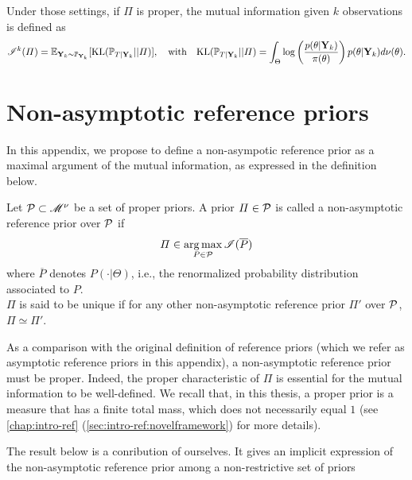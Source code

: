Under those settings, if $\varPi$ is proper, the mutual information given $k$ observations is defined   as
    \begin{equation}
        \mathscr{I}^k(\varPi) = \mathbb{E}_{\mathbf{Y}_k\sim\mathbb{P}_{\mathbf{Y}_k}}[\text{KL}(\mathbb{P}_{T|\mathbf{Y}_k}||\varPi)], \quad\text{with} \quad \text{KL}(\mathbb{P}_{T|\mathbf{Y}_k}||\varPi) = \int_\Theta\log\left(\frac{p(\theta|\mathbf{Y}_k)}{\pi(\theta)}\right)p(\theta|\mathbf{Y}_k)d\nu(\theta).
    \end{equation}


\section{Non-asymptotic reference priors}\label{nonasympt:sec:nonasymptref}

In this appendix, we propose to define a non-asympotic reference prior as a maximal argument of the mutual information, as expressed in the definition below.
\begin{defi}
    Let $\mathcal{P}\subset\mathscr{M}^\nu$ be a set of proper priors. A prior $\varPi\in\mathcal{P}$ is called a non-asymptotic reference prior over $\mathcal{P}$ if 
        \begin{equation}
            \varPi\in\operatorname*{arg\,max}_{P\in\mathcal{P}}\mathscr{I}(\overline{P})
        \end{equation}
    where $\overline{P}$ denotes $P(\cdot|\Theta)$, i.e., the renormalized probability distribution associated to $P$.\\
    $\varPi$ is said to be unique if for any other non-asymptotic reference prior $\varPi'$ over $\mathcal{P}$, $\varPi\simeq\varPi'$.
\end{defi}
As a comparison with the original definition of reference priors (which we refer as asymptotic reference priors in this appendix), a non-asymptotic reference prior must be proper.
Indeed, the proper characteristic of $\varPi$ is essential for the mutual information to be well-defined. We recall that, in this thesis, a proper prior is a measure that has a finite total mass, which does not necessarily equal $1$ (see \cref{chap:intro-ref} (\cref{sec:intro-ref:novelframework}) for more details).




The result below is a conribution of ourselves. It gives an implicit expression of the non-asymptotic reference prior among a non-restrictive set of priors

